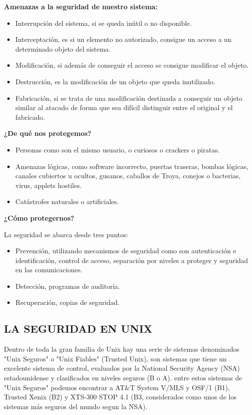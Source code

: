 \textbf{Amenazas a  la seguridad de nuestro sistema:} 

\begin{itemize}
	\item	Interrupción del  sistema, si se queda inútil o  no disponible.
	\item Interceptación, es si un elemento no autorizado, consigue un acceso a un determinado objeto del sistema.
	\item Modificación, si además de conseguir el acceso se consigue modificar el objeto.
	\item Destrucción, es la modificación de un objeto que queda inutilizado.
	\item Fabricación, si se trata de una modificación destinada a conseguir un objeto similar al atacado de forma que sea difícil distinguir entre el original y el fabricado.
\end{itemize}

\textbf{¿De qué nos protegemos?}

\begin{itemize}
	\item Personas como son el mismo usuario, o curiosos o crackers o piratas.
	\item Amenazas lógicas, como software incorrecto, puertas traseras, bombas lógicas, canales cubiertos u ocultos, gusanos, caballos de Troya, conejos o bacterias, virus, 		
			applets hostiles.
	\item Catástrofes naturales o artificiales. 
\end{itemize}

\textbf{¿Cómo protegernos?}

La seguridad se abarca desde tres puntos:
\begin{itemize}
	\item Prevención, utilizando mecanismos de seguridad como son autenticación e identificación, control de acceso, separación por niveles a proteger y seguridad en las 
			comunicaciones.
	\item Detección, programas de auditoría.
	\item Recuperación, copias de seguridad.
\end{itemize}

\subsection*{LA SEGURIDAD  EN  UNIX}
Dentro  de  toda  la gran familia de Unix  hay  una  serie de sistemas denominados "Unix Seguros"  o "Unix Fiables" (Trusted Unix), son sistemas  que  tiene  un excelente sistema 
de control, evaluados  por la National Security Agency (NSA) estadounidense y clasificados en niveles seguros (B o A). entre estos sistemas  de  "Unix  Seguros" podemos  
encontrar  a  AT\&T System V/MLS  y  OSF/1 (B1), Trusted Xenix (B2) y  XTS-300 STOP 4.1 (B3, considerados como unos de los  sistemas  más  seguros  del  mundo segun  la  NSA).
 
